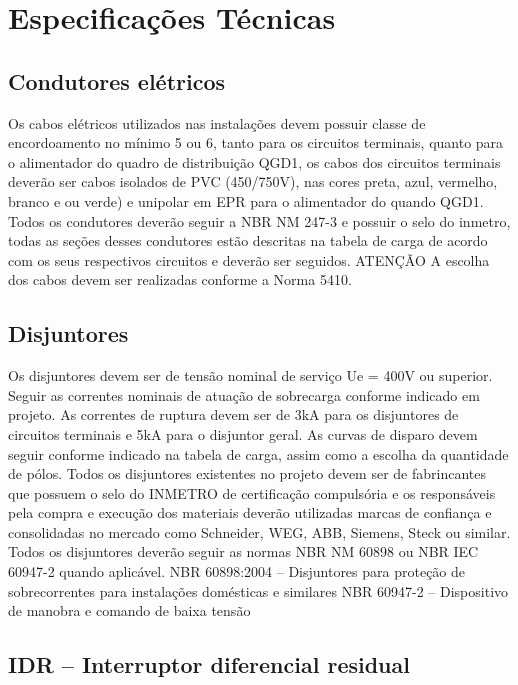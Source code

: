 \section{Especificações Técnicas}

\subsection{Condutores elétricos}
Os cabos elétricos utilizados nas instalações devem possuir classe de encordoamento no mínimo 5 ou 6, tanto para os circuitos terminais, quanto para o alimentador do quadro de distribuição QGD1, os cabos dos circuitos terminais deverão ser cabos isolados de PVC (450/750V), nas cores preta, azul, vermelho, branco e ou verde) e unipolar em EPR para o alimentador do quando QGD1. 
Todos os condutores deverão seguir a NBR NM 247-3 e possuir o selo do inmetro, todas as seções desses condutores estão descritas na tabela de carga de acordo com os seus respectivos circuitos e deverão ser seguidos.
ATENÇÃO A escolha dos cabos devem ser realizadas conforme a Norma 5410.

\subsection{Disjuntores}
Os disjuntores devem ser de tensão nominal de serviço Ue = 400V ou superior. Seguir as correntes nominais de atuação de sobrecarga conforme indicado em projeto. As correntes de ruptura devem ser de 3kA para os disjuntores de circuitos terminais e 5kA para o disjuntor geral. As curvas de disparo devem seguir conforme indicado na tabela de carga, assim como a escolha da quantidade de pólos.
Todos os disjuntores existentes no projeto devem ser de fabrincantes que possuem o selo do INMETRO de certificação compulsória e os responsáveis pela compra e execução dos materiais deverão utilizadas marcas de confiança e consolidadas no mercado como Schneider, WEG, ABB, Siemens, Steck ou similar. Todos os disjuntores deverão seguir as normas NBR NM 60898 ou NBR IEC 60947-2 quando aplicável.  NBR 60898:2004 – Disjuntores para proteção de sobrecorrentes para instalações domésticas e similares 
NBR 60947-2 – Dispositivo de manobra e comando de baixa tensão

\subsection{IDR – Interruptor diferencial residual}

